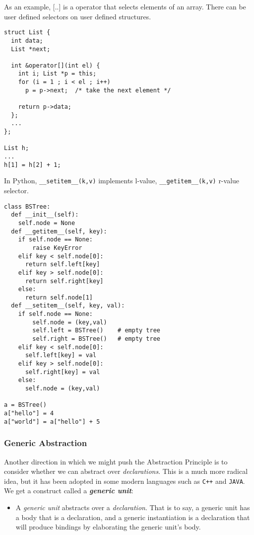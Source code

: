 \vspace*{\fill}
\columnbreak

As an example, [..] is a operator that selects elements of an array. There can be user defined selectors on user defined structures.

\begin{listing}[H]

\begin{verbatim}
struct List {
  int data;
  List *next;

  int &operator[](int el) {
    int i; List *p = this;
    for (i = 1 ; i < el ; i++) 
      p = p->next;  /* take the next element */
  
    return p->data;
  };
  ...
};

List h;
...
h[1] = h[2] + 1;
\end{verbatim}
\caption{}
\label{code:code1}
\end{listing}

In Python, \texttt{__setitem__(k,v)} implements l-value, \texttt{__getitem__(k,v)} r-value selector.

\begin{listing}[H]

\begin{verbatim}
class BSTree:
  def __init__(self):
    self.node = None
  def __getitem__(self, key):
    if self.node == None:
        raise KeyError
    elif key < self.node[0]:
      return self.left[key]
    elif key > self.node[0]:
      return self.right[key]
    else:
      return self.node[1]
  def __setitem__(self, key, val):
    if self.node == None:
        self.node = (key,val)
        self.left = BSTree()    # empty tree
        self.right = BSTree()   # empty tree
    elif key < self.node[0]:
      self.left[key] = val
    elif key > self.node[0]:
      self.right[key] = val
    else:
      self.node = (key,val)

a = BSTree()
a["hello"] = 4
a["world"] = a["hello"] + 5
\end{verbatim}
\caption{}
\label{code:code2}
\end{listing}

\vspace*{\fill}
\columnbreak

\subsubsection{Generic Abstraction}

Another direction in which we might push the Abstraction Principle is to
consider whether we can abstract over \textit{declarations}. This is a much more radical idea, but it has been adopted in some modern languages such as \texttt{C++} and \texttt{JAVA}. We get a construct called a \textit{\textbf{generic unit}}:
\begin{itemize}
  \item A \textit{generic unit} abstracts over a \textit{declaration}. That is to say, a generic unit has a body that is a declaration, and a generic instantiation is a declaration that will produce bindings by elaborating the generic unit's body.
\end{itemize}

